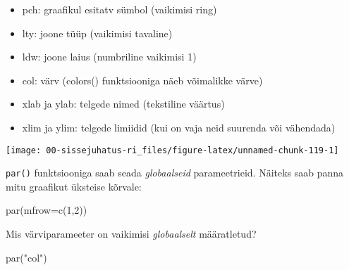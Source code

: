 \documentclass[
]{book}
\newenvironment{Shaded}{\begin{snugshade}}{\end{snugshade}}
\newcommand{\AttributeTok}[1]{\textcolor[rgb]{0.77,0.63,0.00}{#1}}
\newcommand{\DecValTok}[1]{\textcolor[rgb]{0.00,0.00,0.81}{#1}}
\newcommand{\FunctionTok}[1]{\textcolor[rgb]{0.00,0.00,0.00}{#1}}
\newcommand{\NormalTok}[1]{#1}
\newcommand{\SpecialCharTok}[1]{\textcolor[rgb]{0.00,0.00,0.00}{#1}}
\newcommand{\StringTok}[1]{\textcolor[rgb]{0.31,0.60,0.02}{#1}}
\providecommand{\tightlist}{%
  \setlength{\itemsep}{0pt}\setlength{\parskip}{0pt}}
\begin{document}
\begin{itemize}
\tightlist
\item
  pch: graafikul esitatv sümbol (vaikimisi ring)
\item
  lty: joone tüüp (vaikimisi tavaline)
\item
  ldw: joone laius (numbriline vaikimisi 1)
\item
  col: värv (colors() funktsiooniga näeb võimalikke värve)
\item
  xlab ja ylab: telgede nimed (tekstiline väärtus)
\item
  xlim ja ylim: telgede limiidid (kui on vaja neid suurenda või vähendada)
\end{itemize}

\begin{Shaded}
\end{Shaded}

\begin{center}\texttt{[image: 00-sissejuhatus-ri\_files/figure-latex/unnamed-chunk-119-1]} \end{center}

\texttt{par()} funktsiooniga saab seada \emph{globaalseid} parameetrieid. Näiteks saab panna mitu graafikut üksteise kõrvale:

\begin{Shaded}
\begin{Highlighting}[]
\FunctionTok{par}\NormalTok{(}\AttributeTok{mfrow=}\FunctionTok{c}\NormalTok{(}\DecValTok{1}\NormalTok{,}\DecValTok{2}\NormalTok{))}
\end{Highlighting}
\end{Shaded}

Mis värviparameeter on vaikimisi \emph{globaalselt} määratletud?

\begin{Shaded}
\begin{Highlighting}[]
\FunctionTok{par}\NormalTok{(}\StringTok{"col"}\NormalTok{)}
\end{Highlighting}
\end{Shaded}
\end{document}
